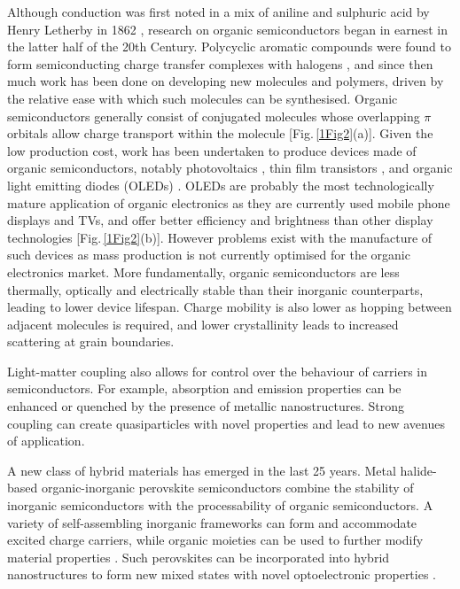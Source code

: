 Although conduction was first noted in a mix of aniline and sulphuric acid by Henry Letherby in 1862 \cite{Letheby}, research on organic semiconductors began in earnest in the latter half of the 20th Century. Polycyclic aromatic compounds were found to form semiconducting charge transfer complexes with halogens \cite{Naarmann2002}, and since then much work has been done on developing new molecules and polymers, driven by the relative ease with which such molecules can be synthesised. Organic semiconductors generally consist of conjugated molecules whose overlapping $\pi$ orbitals allow charge transport within the molecule [Fig.\,\ref{1Fig2}(a)]. Given the low production cost, work has been undertaken to produce devices made of organic semiconductors, notably photovoltaics \cite{Halls1996, Chiu2012, Li2006}, thin film transistors \cite{Klauk2010, Fukuda2014, Yuan2014}, and organic light emitting diodes (OLEDs) \cite{Tang1987, Burroughes1990, Hebner1998}. OLEDs are probably the most technologically mature application of organic electronics as they are currently used mobile phone displays and TVs, and offer better efficiency and brightness than other display technologies [Fig.\,\ref{1Fig2}(b)]. However problems exist with the manufacture of such devices as mass production is not currently optimised for the organic electronics market. More fundamentally, organic semiconductors are less thermally, optically and electrically stable than their inorganic counterparts, leading to lower device lifespan. Charge mobility is also lower as hopping between adjacent molecules is required, and lower crystallinity leads to increased scattering at grain boundaries. 

Light-matter coupling also allows for control over the behaviour of carriers in semiconductors. For example, absorption and emission properties can be enhanced \cite{Balci2014, Alemu2014, Zheng2011, Xu2013, Spinelli2012} or quenched \cite{Raikar2011, Samanta2014, Bhanu2014} by the presence of metallic nanostructures. Strong coupling can create quasiparticles with novel properties \cite{Kasprzak2006, Christopoulos2007, Amo2010} and lead to new avenues of application.

A new class of hybrid materials has emerged in the last 25 years. Metal halide-based organic-inorganic perovskite semiconductors combine the stability of inorganic semiconductors with the processability of organic semiconductors. A variety of self-assembling inorganic frameworks can form and accommodate excited charge carriers, while organic moieties can be used to further modify material properties \cite{Cheng2010, Ishihara1990, Mitzi2001, Mitzi2001c, Nagami1996, Pradeesh2010, Pradeesh2009a, Lee2012, Heo2013, Liu2013, Hao2014}. Such perovskites can be incorporated into hybrid nanostructures to form new mixed states with novel optoelectronic properties \cite{Fujita1998, Fujita1999, Fujita2000, Ishi-Hayase2003, Brehier2006, Lanty2008, Pradeesh2009b, Sumioka2001}.

